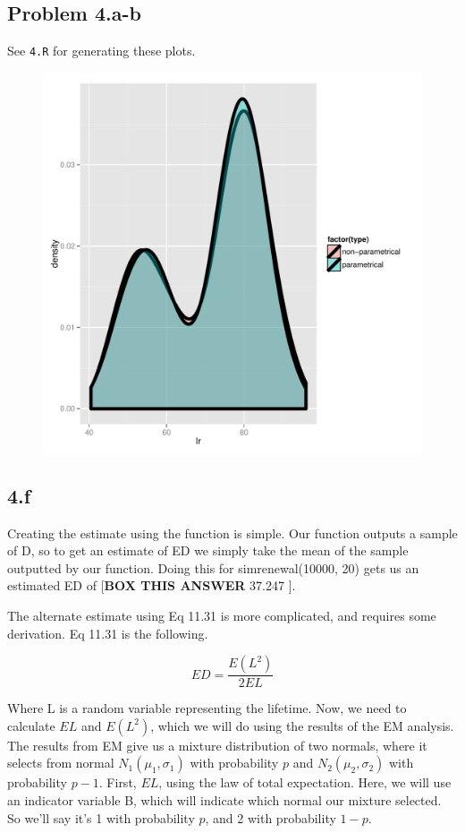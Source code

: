 \documentclass[letter]{article}
\begin{document}
\subsection*{Problem 4.a-b}

See \texttt{4.R} for generating these plots. 
\begin{figure}[h]
 \includegraphics[scale=0.5]{plot4b.pdf}
\end{figure}
\pagebreak

\subsection*{4.f}

Creating the estimate using the function is simple. Our function outputs a sample of D, so to get an estimate of ED we simply take the mean of the sample outputted by our function. Doing this for simrenewal(10000, 20) gets us an estimated ED of [\textbf{BOX THIS ANSWER} 37.247 ].

The alternate estimate using Eq 11.31 is more complicated, and requires some derivation. Eq 11.31 is the following.

\begin{equation}
	ED = \frac{E(L^2)}{2EL}
\end{equation}

Where L is a random variable representing the lifetime. Now, we need to calculate $EL$ and $E(L^2)$, which we will do using the results of the EM analysis. The results from EM give us a mixture distribution of two normals, where it selects from normal $N_1(\mu_1, \sigma_1)$ with probability $p$ and $N_2(\mu_2, \sigma_2)$ with probability $p-1$. First, $EL$, using the law of total expectation. Here, we will use an indicator variable B, which will indicate which normal our mixture selected. So we'll say it's 1 with probability $p$, and 2 with probability $1-p$.
\end{document}
